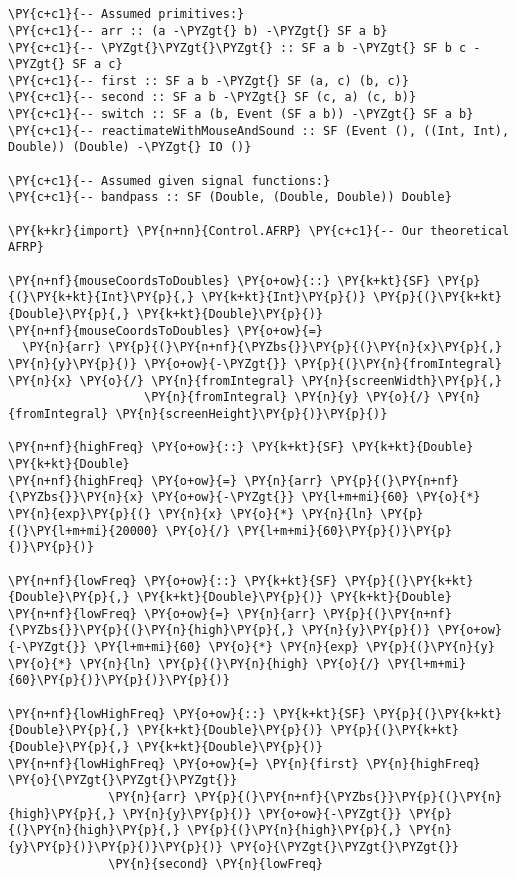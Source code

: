 \documentclass{article}
\begin{document}
\section*{}

\begin{Verbatim}[commandchars=\\\{\}]
\PY{c+c1}{-- Assumed primitives:}
\PY{c+c1}{-- arr :: (a -\PYZgt{} b) -\PYZgt{} SF a b}
\PY{c+c1}{-- \PYZgt{}\PYZgt{}\PYZgt{} :: SF a b -\PYZgt{} SF b c -\PYZgt{} SF a c}
\PY{c+c1}{-- first :: SF a b -\PYZgt{} SF (a, c) (b, c)}
\PY{c+c1}{-- second :: SF a b -\PYZgt{} SF (c, a) (c, b)}
\PY{c+c1}{-- switch :: SF a (b, Event (SF a b)) -\PYZgt{} SF a b}
\PY{c+c1}{-- reactimateWithMouseAndSound :: SF (Event (), ((Int, Int), Double)) (Double) -\PYZgt{} IO ()}

\PY{c+c1}{-- Assumed given signal functions:}
\PY{c+c1}{-- bandpass :: SF (Double, (Double, Double)) Double}

\PY{k+kr}{import} \PY{n+nn}{Control.AFRP} \PY{c+c1}{-- Our theoretical AFRP}

\PY{n+nf}{mouseCoordsToDoubles} \PY{o+ow}{::} \PY{k+kt}{SF} \PY{p}{(}\PY{k+kt}{Int}\PY{p}{,} \PY{k+kt}{Int}\PY{p}{)} \PY{p}{(}\PY{k+kt}{Double}\PY{p}{,} \PY{k+kt}{Double}\PY{p}{)}
\PY{n+nf}{mouseCoordsToDoubles} \PY{o+ow}{=} 
  \PY{n}{arr} \PY{p}{(}\PY{n+nf}{\PYZbs{}}\PY{p}{(}\PY{n}{x}\PY{p}{,} \PY{n}{y}\PY{p}{)} \PY{o+ow}{-\PYZgt{}} \PY{p}{(}\PY{n}{fromIntegral} \PY{n}{x} \PY{o}{/} \PY{n}{fromIntegral} \PY{n}{screenWidth}\PY{p}{,} 
                   \PY{n}{fromIntegral} \PY{n}{y} \PY{o}{/} \PY{n}{fromIntegral} \PY{n}{screenHeight}\PY{p}{)}\PY{p}{)}

\PY{n+nf}{highFreq} \PY{o+ow}{::} \PY{k+kt}{SF} \PY{k+kt}{Double} \PY{k+kt}{Double}
\PY{n+nf}{highFreq} \PY{o+ow}{=} \PY{n}{arr} \PY{p}{(}\PY{n+nf}{\PYZbs{}}\PY{n}{x} \PY{o+ow}{-\PYZgt{}} \PY{l+m+mi}{60} \PY{o}{*} \PY{n}{exp}\PY{p}{(} \PY{n}{x} \PY{o}{*} \PY{n}{ln} \PY{p}{(}\PY{l+m+mi}{20000} \PY{o}{/} \PY{l+m+mi}{60}\PY{p}{)}\PY{p}{)}\PY{p}{)}

\PY{n+nf}{lowFreq} \PY{o+ow}{::} \PY{k+kt}{SF} \PY{p}{(}\PY{k+kt}{Double}\PY{p}{,} \PY{k+kt}{Double}\PY{p}{)} \PY{k+kt}{Double}
\PY{n+nf}{lowFreq} \PY{o+ow}{=} \PY{n}{arr} \PY{p}{(}\PY{n+nf}{\PYZbs{}}\PY{p}{(}\PY{n}{high}\PY{p}{,} \PY{n}{y}\PY{p}{)} \PY{o+ow}{-\PYZgt{}} \PY{l+m+mi}{60} \PY{o}{*} \PY{n}{exp} \PY{p}{(}\PY{n}{y} \PY{o}{*} \PY{n}{ln} \PY{p}{(}\PY{n}{high} \PY{o}{/} \PY{l+m+mi}{60}\PY{p}{)}\PY{p}{)}\PY{p}{)}

\PY{n+nf}{lowHighFreq} \PY{o+ow}{::} \PY{k+kt}{SF} \PY{p}{(}\PY{k+kt}{Double}\PY{p}{,} \PY{k+kt}{Double}\PY{p}{)} \PY{p}{(}\PY{k+kt}{Double}\PY{p}{,} \PY{k+kt}{Double}\PY{p}{)}
\PY{n+nf}{lowHighFreq} \PY{o+ow}{=} \PY{n}{first} \PY{n}{highFreq} \PY{o}{\PYZgt{}\PYZgt{}\PYZgt{}} 
              \PY{n}{arr} \PY{p}{(}\PY{n+nf}{\PYZbs{}}\PY{p}{(}\PY{n}{high}\PY{p}{,} \PY{n}{y}\PY{p}{)} \PY{o+ow}{-\PYZgt{}} \PY{p}{(}\PY{n}{high}\PY{p}{,} \PY{p}{(}\PY{n}{high}\PY{p}{,} \PY{n}{y}\PY{p}{)}\PY{p}{)}\PY{p}{)} \PY{o}{\PYZgt{}\PYZgt{}\PYZgt{}}
              \PY{n}{second} \PY{n}{lowFreq}


\end{Verbatim}
\end{document}
